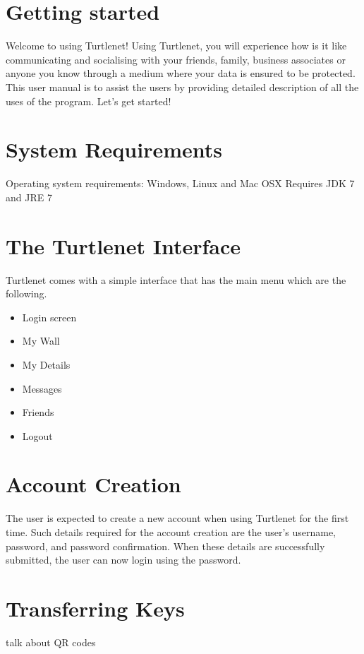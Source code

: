 \section{Getting started}
Welcome to using Turtlenet! Using Turtlenet, you will experience how is it like communicating and socialising with your friends, family, business associates or anyone you know through a medium where your data is ensured to be protected. This user manual is to assist the users by providing detailed description of all the uses of the program. Let's get started!

\section{System Requirements}
Operating system requirements: Windows, Linux and Mac OSX
Requires JDK 7 and JRE 7

\section{The Turtlenet Interface}
Turtlenet comes with a simple interface that has the main menu which are the following.
\begin{itemize}
\item Login screen
\item My Wall
\item My Details
\item Messages
\item Friends
\item Logout
\end{itemize}

\section{Account Creation}
The user is expected to create a new account when using Turtlenet for the first time. Such details required for the account creation are the user's username, password, and password confirmation. When these details are successfully submitted, the user can now login using the password.

\section{Transferring Keys}
talk about QR codes